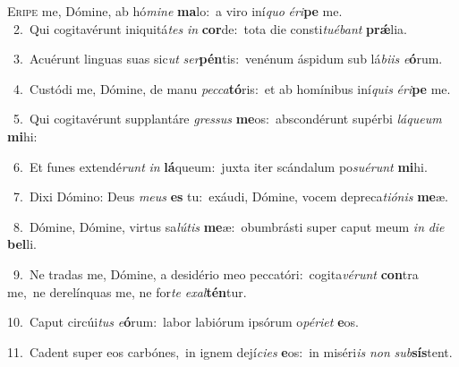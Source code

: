 \lettrine{\initial\textcolor{\initialcolor}{E}}{ripe} me, Dómine, ab hó\-\textit{mi}\-\textit{ne} \textbf{ma}\-lo:~\star a viro iní\textit{quo} \textit{é}\-\textit{ri}\textbf{pe} me.\\
{\numbfont\textcolor{\numbcolor}{~2.}}~Qui cogitavérunt iniquitá\textit{tes} \textit{in} \textbf{cor}\-de:~\star tota die consti\-\textit{tu}\-\textit{é}\textit{bant} \textbf{prǽ}\-lia.\par
{\numbfont\textcolor{\numbcolor}{~3.}}~Acuérunt linguas suas sic\textit{ut} \textit{ser}\-\textbf{pén}tis:~\star venénum áspidum sub lá\-\textit{bi}\-\textit{is} \textit{e}\-\textbf{ó}rum.\par
{\numbfont\textcolor{\numbcolor}{~4.}}~Custódi me, Dómine, de manu \textit{pec}\-\textit{ca}\textbf{tó}ris:~\star et ab homínibus iní\textit{quis} \textit{é}\-\textit{ri}\textbf{pe} me.\par
{\numbfont\textcolor{\numbcolor}{~5.}}~Qui cogitavérunt supplantáre \textit{gres}\-\textit{sus} \textbf{me}\-os:~\star abscondérunt supérbi \textit{lá}\-\textit{que}\textit{um} \textbf{mi}\-hi:\par
{\numbfont\textcolor{\numbcolor}{~6.}}~Et funes extendé\textit{runt} \textit{in} \textbf{lá}\-queum:~\star juxta iter scándalum po\-\textit{su}\-\textit{é}\textit{runt} \textbf{mi}\-hi.\par
{\numbfont\textcolor{\numbcolor}{~7.}}~Dixi Dómino: Deus \textit{me}\-\textit{us} \textbf{es} tu:~\star exáudi, Dómine, vocem depreca\-\textit{ti}\-\textit{ó}\textit{nis} \textbf{me}\-æ.\par
{\numbfont\textcolor{\numbcolor}{~8.}}~Dómine, Dómine, virtus sa\-\textit{lú}\-\textit{tis} \textbf{me}\-æ:~\star obumbrásti super caput meum \textit{in} \textit{di}\-\textit{e} \textbf{bel}\-li.\par
{\numbfont\textcolor{\numbcolor}{~9.}}~Ne tradas me, Dómine, a desidério meo peccatóri:~\dagger cogita\-\textit{vé}\-\textit{runt} \textbf{con}\-tra me,~\star ne derelínquas me, ne for\textit{te} \textit{ex}\-\textit{al}\textbf{tén}tur.\par
{\numbfont\textcolor{\numbcolor}{10.}}~Caput circúi\textit{tus} \textit{e}\-\textbf{ó}rum:~\star labor labiórum ipsórum o\-\textit{pé}\-\textit{ri}\textit{et} \textbf{e}\-os.\par
{\numbfont\textcolor{\numbcolor}{11.}}~Cadent super eos carbónes,~\dagger in ignem dejí\-\textit{ci}\-\textit{es} \textbf{e}\-os:~\star in miséri\textit{is} \textit{non} \textit{sub}\-\textbf{sís}tent.\par
